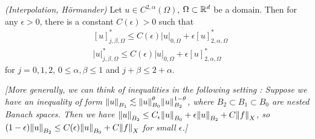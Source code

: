 \documentclass[12pt,a4paper]{article}
\begin{document}
 \emph{(Interpolation, H\"ormander)} Let $u\in C^{2, \alpha}(\Omega)$, $\Omega \subset\mathbb{R}^d$ be a domain. Then for any $\epsilon >0$, there is a constant $C(\epsilon)>0$ such that
\begin{align*}
&[u]^*_{j, \beta, \Omega} \leq C(\epsilon) |u|_{0, \Omega} + \epsilon [u]^*_{2, \alpha, \Omega} \\
&|u|^*_{j, \beta, \Omega} \leq C(\epsilon) |u|_{0, \Omega} + \epsilon [u]^*_{2, \alpha, \Omega}
\end{align*}
for $j=0,1,2$, $0\leq \alpha, \beta\leq 1$ and $j+\beta\leq 2+\alpha$.
\s

\emph{[More generally, we can think of inequalities in the following setting : Suppose we have an inequality of form $\snorms{u}{B_1} \lesssim \snorms{u}{B_0}^{\theta} \snorms{u}{B_2}^{1-\theta}$, where $B_2\subset B_1 \subset B_0$ are nested Banach spaces. Then we have $\snorms{u}{B_2} \leq C_{\epsilon} \snorms{u}{B_0} + \epsilon \snorms{u}{B_2} + C \snorms{f}{X}$, so $(1-\epsilon)\snorms{u}{B_2} \leq C(\epsilon) \snorms{u}{B_0} + C\snorms{f}{X}$ for small $\epsilon$.]}
\s
\end{document}
